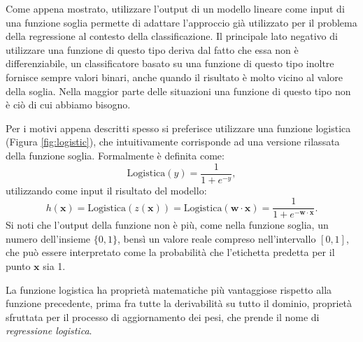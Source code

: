 \documentclass[../../main.tex]{subfiles}
\begin{document}
    Come appena mostrato, utilizzare l'output di un modello lineare come input di una funzione soglia permette di adattare l'approccio già utilizzato per il problema della regressione al contesto della classificazione. Il principale lato negativo di utilizzare una funzione di questo tipo deriva dal fatto che essa non è differenziabile, un classificatore basato su una funzione di questo tipo inoltre fornisce sempre valori binari, anche quando il risultato è molto vicino al valore della soglia. Nella maggior parte delle situazioni una funzione di questo tipo non è ciò di cui abbiamo bisogno.

    Per i motivi appena descritti spesso si preferisce utilizzare una funzione logistica (Figura \ref{fig:logistic}), che intuitivamente corrisponde ad una versione rilassata della funzione soglia. Formalmente è definita come:
    \[ \text{Logistica}(y) = \frac{1}{1 + e^{-y}}, \]
    utilizzando come input il risultato del modello:
    \[h(\boldsymbol{x}) = \text{Logistica}(z(\boldsymbol{x})) = \text{Logistica}(\boldsymbol{w} \cdot \boldsymbol{x}) = \frac{1}{1 + e^{- \boldsymbol{w \cdot x}}} .\]
    Si noti che l'output della funzione non è più, come nella funzione soglia, un numero dell'insieme $\{0,1\}$, bensì un valore reale compreso nell'intervallo $[0, 1]$, che può essere interpretato come la probabilità che l'etichetta predetta per il punto $\boldsymbol{x}$ sia 1.

    La funzione logistica ha proprietà matematiche più vantaggiose rispetto alla funzione precedente, prima fra tutte la derivabilità su tutto il dominio, proprietà sfruttata per il processo di aggiornamento dei pesi, che prende il nome di \textit{regressione logistica}. 
    
\end{document}
